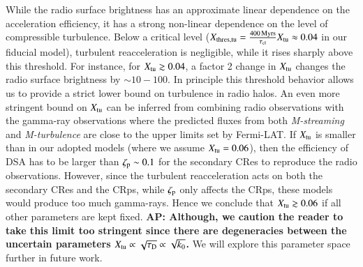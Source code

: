 \documentclass[a4paper,fleqn,usenatbib]{mnras}
\newcommand{\Mstream}{{\it M-streaming}\xspace}
\newcommand{\Mflatturb}{{\it M-turbulence}\xspace}
\def\AP#1{{\bf  AP: #1}}
\begin{document}
While the radio surface brightness has an approximate linear
dependence on the acceleration efficiency, it has a strong non-linear
dependence on the level of compressible turbulence. Below a critical
level ($X_{\mathrm{thres,tu}} = 
\frac{400\,{\mathrm{Myrs}}}{\tau_{\mathrm{cl}}} X_{\mathrm{tu}}\approx 0.04$ in our fiducial model),
turbulent reacceleration is negligible, while it rises sharply above
this threshold. For instance, for $X_{\mathrm{tu}}\gtrsim0.04$, a factor 2 change
in $X_{\mathrm{tu}}$ changes the radio surface brightness by $\sim
10-100$. In principle this threshold behavior allows us to provide a
strict lower bound on turbulence in radio halos. An even more
stringent bound on $X_{\mathrm{tu}}$ can be inferred from combining radio
observations with the gamma-ray observations where the predicted
fluxes from both \Mstream and \Mflatturb are close to the upper limits
set by Fermi-LAT. If $X_{\mathrm{tu}}$ is smaller than in our adopted
models (where we assume $X_{\mathrm{tu}}=0.06$), then the efficiency of DSA
has to be larger than $\zeta_{\mathrm{p}}\sim 0.1$ for the secondary CRes
to reproduce the radio observations. However, since the turbulent
reacceleration acts on both the secondary CRes and the CRps, while
$\zeta_{\mathrm{p}}$ only affects the CRps, these models would produce too
much gamma-rays. Hence we conclude that $X_{\mathrm{tu}}\gtrsim0.06$ if all
other parameters are kept fixed. \AP{Although, we caution the reader
  to take this limit too stringent since there are degeneracies between
  the uncertain parameters
  $X_{\mathrm{tu}}\propto\sqrt{\tau_{\mathrm{D}}}\propto \sqrt{k_0}$.} We will
explore this parameter space further in future work.
\end{document}
